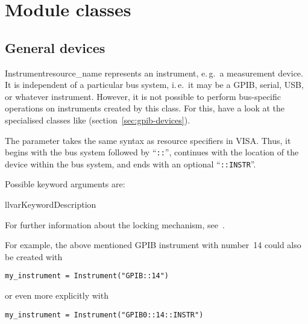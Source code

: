 \documentclass{howto}
\begin{document}
\section{Module classes}

\subsection{General devices}
\label{sec:general-devices}

\begin{classdesc}{Instrument}{resource_name}
  represents an instrument, e.\,g.\ a measurement device.  It is independent of
  a particular bus system, i.\,e.\ it may be a GPIB, serial, USB, or whatever
  instrument.  However, it is not possible to perform bus-specific operations
  on instruments created by this class.  For this, have a look at the
  specialised classes like 
  (section~\ref{sec:gpib-devices}).

  The parameter  takes the same syntax as resource
  specifiers in VISA\@.  Thus, it begins with the bus system followed by
  ``\verb|::|'', continues with the location of the device within the bus
  system, and ends with an optional ``\verb|::INSTR|''.

  Possible keyword arguments are:
  \begin{tableii}{ll}{var}{Keyword}{Description}
  \end{tableii}

  \vspace{1ex}
  For further information about the locking mechanism,
  see~.
\end{classdesc}

For example, the above mentioned GPIB instrument with number~14 could also be
created with
\begin{verbatim}
my_instrument = Instrument("GPIB::14")
\end{verbatim}
or even more explicitly with
\begin{verbatim}
my_instrument = Instrument("GPIB0::14::INSTR")
\end{verbatim}
\end{document}
